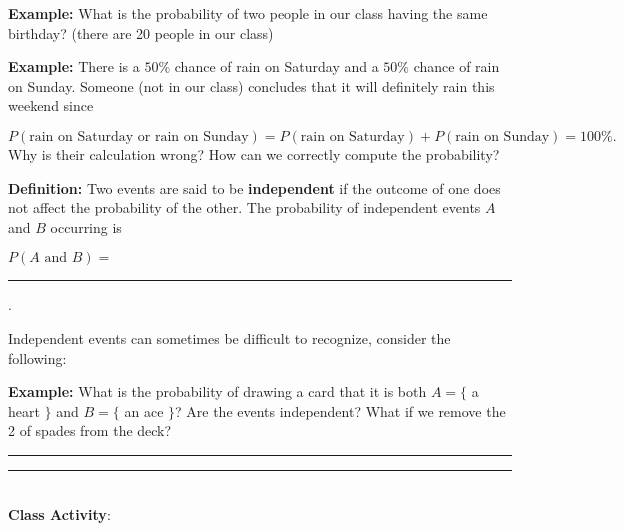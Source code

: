 \documentclass[oneside]{amsart}
\makeatletter
\def\vhrulefill#1{\leavevmode\leaders\hrule\@height#1\hfill \kern\z@}
\theoremstyle{definition}
\theoremstyle{definition}
\makeatother
\begin{document}
    \textbf{Example:} What is the probability of two people in our class having the same birthday? (there are 20 people in our class)
    
    \vfill

    \textbf{Example:} There is a $50 \%$ chance of rain on Saturday and a $50 \%$ chance of rain on Sunday. Someone (not in our class) concludes that it will definitely rain this weekend since

    $$P(\text{rain on Saturday or rain on Sunday}) = P(\text{rain on Saturday}) + P(\text{rain on Sunday}) = 100 \%.$$ 
    Why is their calculation wrong? How can we correctly compute the probability?
    \vfill


\begin{ovalbox}{\begin{minipage}{6.8in}
\vspace{5mm}

\textbf{Definition:} Two events are said to be \textbf{independent} if the outcome of one does not affect the probability of the other. The probability of independent events $A$ and $B$ occurring is  \\
\begin{center}
  $P(A \text{ and } B)= $\rule[-2mm]{35mm}{.1mm}.
\end{center}

\vspace{7mm}

\end{minipage}}
\end{ovalbox}

\vspace{2mm}
Independent events can sometimes be difficult to recognize, consider the following:

\textbf{Example:} What is the probability of drawing a card that it is both $A=\{$ a heart $\}$ and $B= \{$ an ace $\}$? Are the events independent? What if we remove the 2 of spades from the deck?

\vfill


\newpage

\vhrulefill{2pt}

\vspace{1mm}
\vhrulefill{2pt}
\\

{\Large \textbf{ Class Activity}:}
\\
\end{document}
